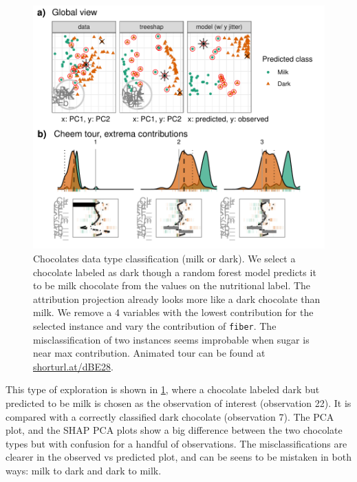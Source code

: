 \documentclass[
]{article}
\begin{document}
\begin{figure}

{\centering \includegraphics[width=1\linewidth]{./figures/case_chocolates} 

}

\caption{Chocolates data type classification (milk or dark). We select a chocolate labeled as dark though a random forest model predicts it to be milk chocolate from the values on the nutritional label. The attribution projection already looks more like a dark chocolate than milk. We remove a 4 variables with the lowest contribution for the selected instance and vary the contribution of \texttt{fiber}. The misclassification of two instances seems improbable when sugar is near max contribution. Animated tour can be found at \href{https://github.com/nspyrison/cheem_paper/blob/main/figures/case_chocolates.mp4}{shorturl.at/dBE28}.}\label{fig:casechocolates}
\end{figure}

This type of exploration is shown in \ref{fig:casechocolates}, where a chocolate labeled dark but predicted to be milk is chosen as the observation of interest (observation 22). It is compared with a correctly classified dark chocolate (observation 7). The PCA plot, and the SHAP PCA plots show a big difference between the two chocolate types but with confusion for a handful of observations. The misclassifications are clearer in the observed vs predicted plot, and can be seens to be mistaken in both ways: milk to dark and dark to milk.
\end{document}
